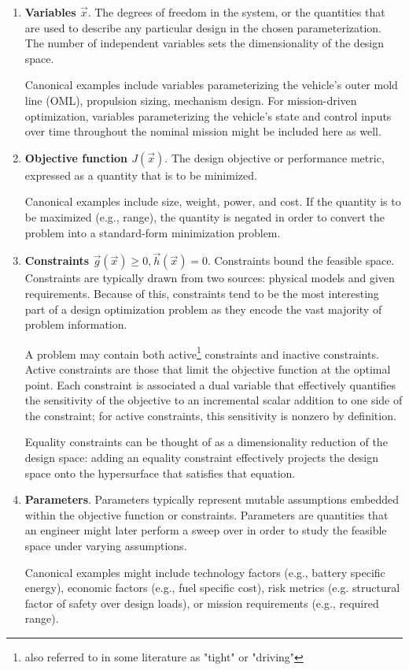 \begin{enumerate}
    \item \textbf{Variables $\vec{x}$}. The degrees of freedom in the system, or the quantities that are used to describe any particular design in the chosen parameterization. The number of independent variables sets the dimensionality of the design space.

    Canonical examples include variables parameterizing the vehicle's outer mold line (OML), propulsion sizing, mechanism design. For mission-driven optimization, variables parameterizing the vehicle's state and control inputs over time throughout the nominal mission might be included here as well.

    \item \textbf{Objective function $J(\vec{x})$}. The design objective or performance metric, expressed as a quantity that is to be minimized.

    Canonical examples include size, weight, power, and cost. If the quantity is to be maximized (e.g., range), the quantity is negated in order to convert the problem into a standard-form minimization problem.

    \item \textbf{Constraints $\vec{g}(\vec{x}) \geq 0, \vec{h}(\vec{x}) = 0$}. Constraints bound the feasible space. Constraints are typically drawn from two sources: physical models and given requirements. Because of this, constraints tend to be the most interesting part of a design optimization problem as they encode the vast majority of problem information.

    A problem may contain both active\footnote{also referred to in some literature as "tight" or "driving"} constraints and inactive constraints. Active constraints are those that limit the objective function at the optimal point. Each constraint is associated a dual variable that effectively quantifies the sensitivity of the objective to an incremental scalar addition to one side of the constraint; for active constraints, this sensitivity is nonzero by definition.

    Equality constraints can be thought of as a dimensionality reduction of the design space: adding an equality constraint effectively projects the design space onto the hypersurface that satisfies that equation.

    \item \textbf{Parameters}. Parameters typically represent mutable assumptions embedded within the objective function or constraints. Parameters are quantities that an engineer might later perform a sweep over in order to study the feasible space under varying assumptions.

    Canonical examples might include technology factors (e.g., battery specific energy), economic factors (e.g., fuel specific cost), risk metrics (e.g. structural factor of safety over design loads), or mission requirements (e.g., required range).

\end{enumerate}

